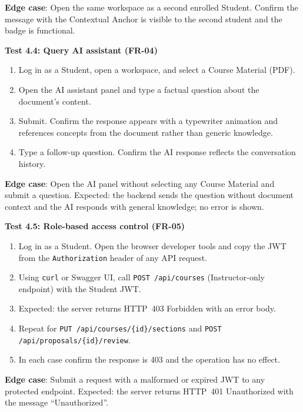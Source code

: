 \noindent\textbf{Edge case}: Open the same workspace as a second enrolled Student. Confirm the
message with the Contextual Anchor is visible to the second student and the badge is functional.

\bigskip
\noindent\textbf{Test 4.4: Query AI assistant (FR-04)}
\begin{enumerate}
    \item Log in as a Student, open a workspace, and select a Course Material (PDF).
    \item Open the AI assistant panel and type a factual question about the document's content.
    \item Submit. Confirm the response appears with a typewriter animation and references
          concepts from the document rather than generic knowledge.
    \item Type a follow-up question. Confirm the AI response reflects the conversation history.
\end{enumerate}

\noindent\textbf{Edge case}: Open the AI panel without selecting any Course Material and submit
a question. Expected: the backend sends the question without document context and the AI responds
with general knowledge; no error is shown.

\bigskip
\noindent\textbf{Test 4.5: Role-based access control (FR-05)}
\begin{enumerate}
    \item Log in as a Student. Open the browser developer tools and copy the JWT from the
          \texttt{Authorization} header of any API request.
    \item Using \texttt{curl} or Swagger UI, call
          \texttt{POST /api/courses} (Instructor-only endpoint) with the Student JWT.
    \item Expected: the server returns HTTP~403 Forbidden with an error body.
    \item Repeat for \texttt{PUT \allowbreak /api/\allowbreak courses/\allowbreak \{id\}/\allowbreak sections}
          and \newline \texttt{POST \allowbreak /api/\allowbreak proposals/\allowbreak \{id\}/\allowbreak review}.
    \item In each case confirm the response is 403 and the operation has no effect.
\end{enumerate}

\noindent\textbf{Edge case}: Submit a request with a malformed or expired JWT to any protected
endpoint. Expected: the server returns HTTP~401 Unauthorized with the message ``Unauthorized''.

